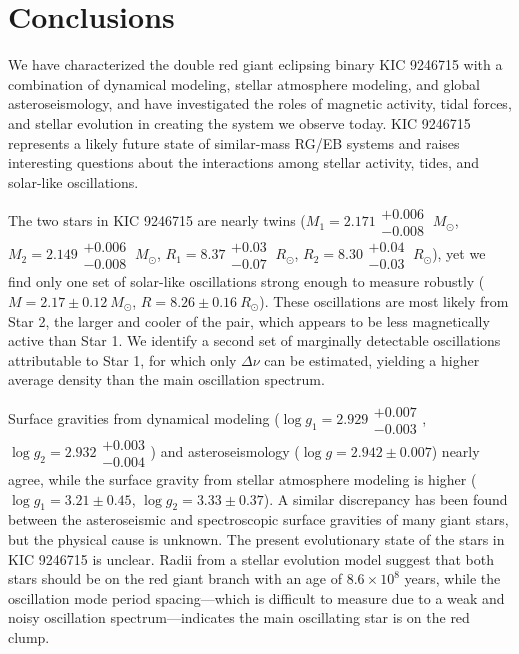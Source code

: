 \section{Conclusions}\label{conclude}


We have characterized the double red giant eclipsing binary KIC 9246715 with a combination of dynamical modeling, stellar atmosphere modeling, and global asteroseismology, and have investigated the roles of magnetic activity, tidal forces, and stellar evolution in creating the system we observe today. KIC 9246715 represents a likely future state of similar-mass RG/EB systems and raises interesting questions about the interactions among stellar activity, tides, and solar-like oscillations.

The two stars in KIC 9246715 are nearly twins ($M_1 = 2.171\substack{+0.006 \\ -0.008} \ M_{\odot}$, $M_2 = 2.149\substack{+0.006 \\ -0.008} \ M_{\odot}$, $R_1 = 8.37\substack{+0.03 \\ -0.07} \ R_{\odot}$, $R_2 = 8.30\substack{+0.04 \\ -0.03} \ R_{\odot}$), yet we find only one set of solar-like oscillations strong enough to measure robustly ($M = 2.17 \pm 0.12 \ M_{\odot}$, $R = 8.26 \pm 0.16 \ R_{\odot}$). These oscillations are most likely from Star 2, the larger and cooler of the pair, which appears to be less magnetically active than Star 1. We identify a second set of marginally detectable oscillations attributable to Star 1, for which only $\Delta \nu$ can be estimated, yielding a higher average density than the main oscillation spectrum.

Surface gravities from dynamical modeling ($\log g_1 = 2.929\substack{+0.007 \\ -0.003}$, $\log g_2 = 2.932\substack{+0.003 \\ -0.004}$) and asteroseismology ($\log g = 2.942 \pm 0.007$) nearly agree, while the surface gravity from stellar atmosphere modeling is higher ($\log g_1 = 3.21 \pm 0.45$, $\log g_2 = 3.33 \pm 0.37$). A similar discrepancy has been found between the asteroseismic and spectroscopic surface gravities of many giant stars, but the physical cause is unknown. The present evolutionary state of the stars in KIC 9246715 is unclear. Radii from a stellar evolution model suggest that both stars should be on the red giant branch with an age of $8.6 \times 10^8$ years, while the oscillation mode period spacing---which is difficult to measure due to a weak and noisy oscillation spectrum---indicates the main oscillating star is on the red clump.

